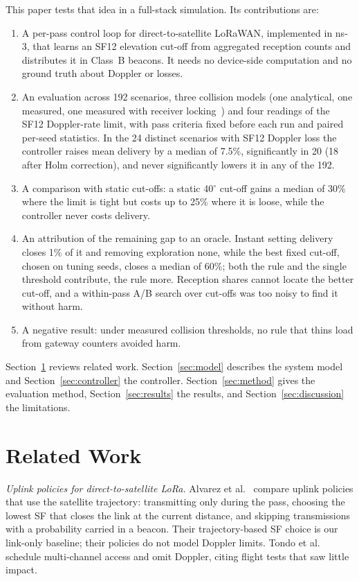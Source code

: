 \documentclass[journal]{IEEEtran}
\begin{document}
This paper tests that idea in a full-stack simulation. Its contributions are:
\begin{enumerate}
\item A per-pass control loop for direct-to-satellite LoRaWAN, implemented in ns-3, that learns an SF12 elevation cut-off from aggregated reception counts and distributes it in Class~B beacons. It needs no device-side computation and no ground truth about Doppler or losses.
\item An evaluation across 192 scenarios, three collision models (one analytical, one measured, one measured with receiver locking~\cite{goursaud2015,croce2018,bor2016}) and four readings of the SF12 Doppler-rate limit, with pass criteria fixed before each run and paired per-seed statistics. In the 24 distinct scenarios with SF12 Doppler loss the controller raises mean delivery by a median of 7.5\%, significantly in 20 (18 after Holm correction), and never significantly lowers it in any of the 192.
\item A comparison with static cut-offs: a static 40$^\circ$ cut-off gains a median of 30\% where the limit is tight but costs up to 25\% where it is loose, while the controller never costs delivery.
\item An attribution of the remaining gap to an oracle. Instant setting delivery closes 1\% of it and removing exploration none, while the best fixed cut-off, chosen on tuning seeds, closes a median of 60\%; both the rule and the single threshold contribute, the rule more. Reception shares cannot locate the better cut-off, and a within-pass A/B search over cut-offs was too noisy to find it without harm.
\item A negative result: under measured collision thresholds, no rule that thins load from gateway counters avoided harm.
\end{enumerate}

Section~\ref{sec:related} reviews related work. Section~\ref{sec:model} describes the system model and Section~\ref{sec:controller} the controller. Section~\ref{sec:method} gives the evaluation method, Section~\ref{sec:results} the results, and Section~\ref{sec:discussion} the limitations.

\section{Related Work}\label{sec:related}
\emph{Uplink policies for direct-to-satellite LoRa.} Alvarez et al.~\cite{alvarez2022} compare uplink policies that use the satellite trajectory: transmitting only during the pass, choosing the lowest SF that closes the link at the current distance, and skipping transmissions with a probability carried in a beacon. Their trajectory-based SF choice is our link-only baseline; their policies do not model Doppler limits. Tondo et al.~\cite{tondo2024} schedule multi-channel access and omit Doppler, citing flight tests that saw little impact.
\end{document}
